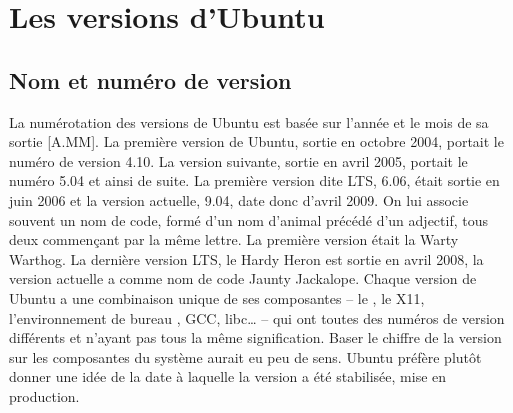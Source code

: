 \section{Les versions d'Ubuntu}
\label{RefVersionUbuntu}
\subsection{Nom et numéro de version}
La numérotation des versions de Ubuntu est basée sur l'année et le mois de sa sortie [A.MM]. La première version de Ubuntu, sortie en octobre 2004, portait le numéro de version 4.10. La version suivante, sortie en avril 2005, portait le numéro 5.04 et ainsi de suite. La première version dite LTS, 6.06, était sortie en juin 2006 et la version actuelle, 9.04, date donc d'avril 2009. On lui associe souvent un nom de code, formé d'un nom d'animal précédé d'un adjectif, tous deux commençant par la même lettre. La première version était la Warty Warthog. %
La dernière version LTS, le Hardy Heron est sortie en avril 2008, la version actuelle a comme nom de code Jaunty Jackalope.
Chaque version de Ubuntu a une combinaison unique de ses composantes -- le , le  X11, l'environnement de bureau , GCC, libc\ldots{} -- qui ont toutes des numéros de version différents et n'ayant pas tous la même signification. Baser le chiffre de la version sur les composantes du système aurait eu peu de sens. Ubuntu préfère plutôt donner une idée de la date à laquelle la version a été stabilisée, mise en production.
